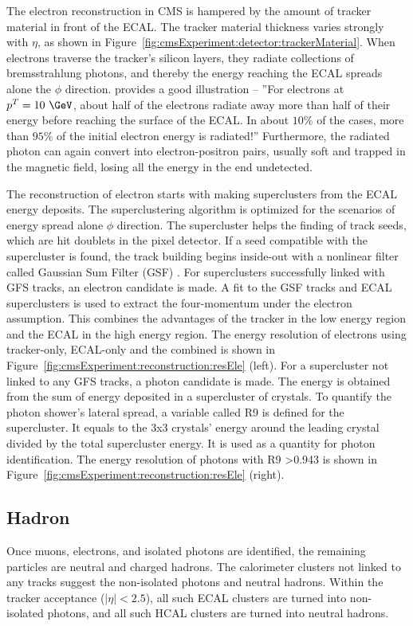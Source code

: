 The electron reconstruction in CMS is hampered by the amount of tracker material in front of the ECAL. The tracker material thickness varies strongly with $\eta$, as shown in Figure~\ref{fig:cmsExperiment:detector:trackerMaterial}. When electrons traverse the tracker's silicon layers, they radiate collections of bremsstrahlung photons, and thereby the energy reaching the ECAL spreads alone the $\phi$ direction. \cite{cms:tdr1:Bayatian:2006nff} provides a good illustration -- ''For electrons at $p^T=10~\GeV$, about half of the electrons radiate away more than half of their energy before reaching the surface of the ECAL. In about $10\%$ of the cases, more than $95\%$ of the initial electron energy is radiated!'' Furthermore, the radiated photon can again convert into electron-positron pairs, usually soft and trapped in the magnetic field, losing all the energy in the end undetected.

The reconstruction of electron starts with making superclusters from the ECAL energy deposits. The superclustering algorithm is optimized for the scenarios of energy spread alone $\phi$ direction. The supercluster helps the finding of track seeds, which are hit doublets in the pixel detector. If a seed compatible with the supercluster is found, the track building begins inside-out with a nonlinear filter called Gaussian Sum Filter (GSF) \cite{tech:gsf:Adam:2005bya}. For superclusters successfully linked with GFS tracks, an electron candidate is made. A fit to the GSF tracks and ECAL superclusters is used to extract the four-momentum under the electron assumption. This combines the advantages of the tracker in the low energy region and the ECAL in the high energy region. The energy resolution of electrons using tracker-only, ECAL-only and the combined is shown in Figure~\ref{fig:cmsExperiment:reconstruction:resEle} (left). For a supercluster not linked to any GFS tracks, a photon candidate is made. The energy is obtained from the sum of energy deposited in a supercluster of crystals. To quantify the photon shower's lateral spread, a variable called R9 is defined for the supercluster. It equals to the 3x3 crystals' energy around the leading crystal divided by the total supercluster energy. It is used as a quantity for photon identification. The energy resolution of photons with R9 >0.943 is shown in Figure~\ref{fig:cmsExperiment:reconstruction:resEle} (right).



\subsection{Hadron}
Once muons, electrons, and isolated photons are identified, the remaining particles are neutral and charged hadrons. The calorimeter clusters not linked to any tracks suggest the non-isolated photons and neutral hadrons. Within the tracker acceptance ($|\eta|< 2.5$), all such ECAL clusters are turned into non-isolated photons, and all such HCAL clusters are turned into neutral hadrons. 

